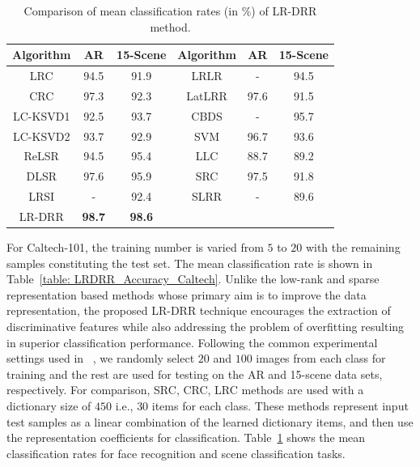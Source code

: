 \begin{table}
\caption{Comparison of mean classification rates (in $\%$) of LR-DRR method.}
\label{table: LRDRR_Accuracy_15_AR}
\centering
\begin{tabular}{|c|c|l|c|c|c|c|}
\hline
Algorithm & \multicolumn{2}{c|}{AR} & 15-Scene & Algorithm & AR & 15-Scene\\ 
\hline 
LRC \cite{LRC} & \multicolumn{2}{c|}{94.5}           & 91.9           & LRLR \cite{LRLR_SLRR}  & -    & 94.5\\ 
\hline
CRC \cite{CRC}      & \multicolumn{2}{c|}{97.3}           & 92.3    & LatLRR \cite{LatLRR} & 97.6 & 91.5\\ 
\hline
LC-KSVD1 \cite{LCKSVD} & \multicolumn{2}{c|}{92.5}           & 93.7  & CBDS \cite{CBDS}  & -    & 95.7\\ 
\hline
LC-KSVD2 \cite{LCKSVD} & \multicolumn{2}{c|}{93.7}           & 92.9  & SVM \cite{SVM}   & 96.7 & 93.6     \\ 
\hline
ReLSR\cite{ReLSR}    & \multicolumn{2}{c|}{94.5}          & 95.4  & LLC \cite{LLC}    & 88.7 & 89.2     \\ 
\hline
DLSR \cite{DLSR}     & \multicolumn{2}{c|}{97.6}           & 95.9  & SRC \cite{SRC}   & 97.5 & 91.8     \\ 
\hline
LRSI \cite{LRSI}     & \multicolumn{2}{c|}{-}              & 92.4  & SLRR \cite{LRLR_SLRR}  & -    & 89.6     \\ 
\hline
LR-DRR & \multicolumn{2}{c|}{\textbf{98.7}} & \textbf{98.6} &     &      & \\ 
\hline
\end{tabular}
\end{table}
%
%
For Caltech-101, the training number is varied from $5$ to $20$ with the remaining samples constituting the test set. The mean classification rate is shown in Table~\ref{table: LRDRR_Accuracy_Caltech}. Unlike the low-rank and sparse representation based methods whose primary aim is to improve the data representation, the proposed LR-DRR technique encourages the extraction of discriminative features while also addressing the problem of overfitting resulting in superior classification performance. Following the common experimental
settings used in ~\cite{LCKSVD, RLSL}, we randomly select $20$ and $100$ images from each class for training and the rest are used for testing on the AR and 15-scene data sets, respectively. For comparison, SRC, CRC, LRC methods are used with a dictionary size of $450$ i.e., $30$ items for each class. These methods represent input test samples as a linear combination of the learned dictionary items, and then use the representation coefficients for classification. Table~\ref{table: LRDRR_Accuracy_15_AR} shows the mean classification rates for face recognition and scene classification tasks.

